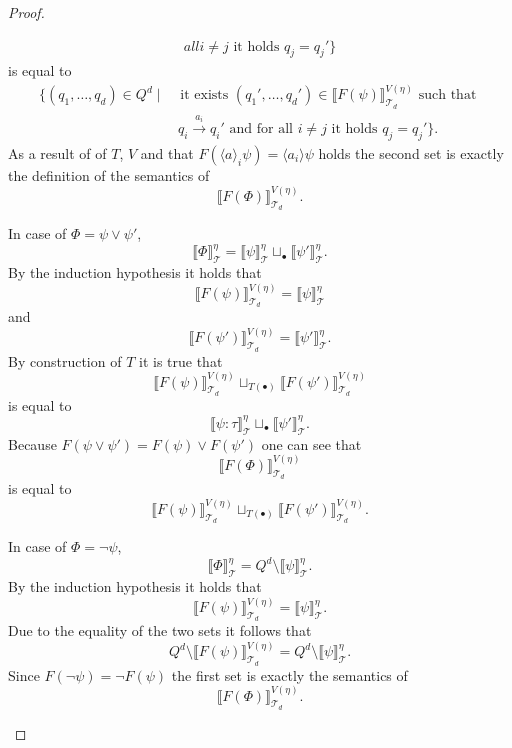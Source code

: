 \begin{proof}
\begin{compactitem}
\begin{align*}
{            all } i \neq j \text{ it holds } q_j = {q_j}'\}
        \end{align*}
        is equal to
        \begin{align*}
            \{(q_1, \dots, q_d) \in Q^d \mid &\text{ it exists } ({q_1}', \dots, {q_d}') \in \llbracket F(\psi) \rrbracket^{V(\eta)}_{\mathcal{T}_d} \text{ such that }\\&\,q_i
            \overset{a_i}{\rightarrow} {q_i}' \text{ and for all } i \neq j \text{ it holds } q_j = {q_j}'\}.
        \end{align*}
        As a result of of $T$, $V$ and that $F(\langle a \rangle_i \psi) = \langle a_i \rangle \psi$ holds the second set is
        exactly the definition of the semantics of
        \[\llbracket F(\Phi) \rrbracket^{V(\eta)}_{\mathcal{T}_d}.\]

        \item In case of $\Phi = \psi \vee {\psi'}$, 
        \[\llbracket \Phi \rrbracket^\eta_\mathcal{T} = \llbracket \psi
        \rrbracket^\eta_\mathcal{T} \sqcup_\bullet \llbracket \psi'
        \rrbracket^\eta_\mathcal{T}.\]
        By the induction hypothesis it holds that \[\llbracket F(\psi) \rrbracket^{V(\eta)}_{\mathcal{T}_d} = \llbracket \psi \rrbracket^\eta_\mathcal{T}\]
        and
        \[\llbracket F(\psi') \rrbracket^{V(\eta)}_{\mathcal{T}_d} = \llbracket \psi' \rrbracket^\eta_\mathcal{T}.\]
        By construction of $T$ it is true that
        \[\llbracket F(\psi) \rrbracket^{V(\eta)}_{\mathcal{T}_d} \sqcup_{T(\bullet)} \llbracket F(\psi') \rrbracket^{V(\eta)}_{\mathcal{T}_d}\]
        is equal to
        \[\llbracket \psi
        \colon \tau \rrbracket^\eta_\mathcal{T} \sqcup_\bullet \llbracket \psi' 
        \rrbracket^\eta_\mathcal{T}.\]
        Because $F(\psi \vee \psi') = F(\psi) \vee F(\psi')$ one can see that
        \[\llbracket F(\Phi) \rrbracket^{V(\eta)}_{\mathcal{T}_d}\]
        is equal to
        \[\llbracket F(\psi) \rrbracket^{V(\eta)}_{\mathcal{T}_d} \sqcup_{T(\bullet)}
        \llbracket F(\psi') \rrbracket^{V(\eta)}_{\mathcal{T}_d}.\]

        \item In case of $\Phi = \neg \psi$,
        \[\llbracket \Phi \rrbracket^\eta_\mathcal{T} = Q^d \setminus
        \llbracket \psi \rrbracket^\eta_\mathcal{T}.\]
        By the induction hypothesis it holds that \[\llbracket F(\psi) \rrbracket^{V(\eta)}_{\mathcal{T}_d} = \llbracket \psi \rrbracket^\eta_\mathcal{T}.\]
        Due to the equality of the two sets it follows that
        \[Q^d \setminus \llbracket F(\psi) \rrbracket^{V(\eta)
        }_{\mathcal{T}_d} =
        Q^d \setminus \llbracket \psi \rrbracket^\eta_\mathcal{T}.\]
        Since $F(\neg \psi) = \neg F(\psi)$ the first set is exactly the semantics of
        \[\llbracket F(\Phi) \rrbracket^{V(\eta)}_{\mathcal{T}_d}.\]


\end{compactitem}
\end{proof}
